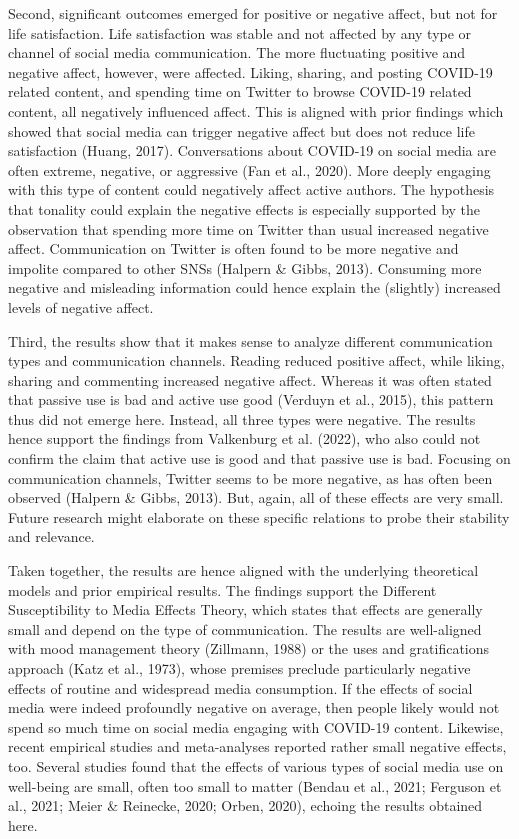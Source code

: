 \documentclass[
  man,floatsintext]{apa7}
\begin{document}
Second, significant outcomes emerged for positive or negative affect, but not for life satisfaction.
Life satisfaction was stable and not affected by any type or channel of social media communication.
The more fluctuating positive and negative affect, however, were affected.
Liking, sharing, and posting COVID-19 related content, and spending time on Twitter to browse COVID-19 related content, all negatively influenced affect.
This is aligned with prior findings which showed that social media can trigger negative affect but does not reduce life satisfaction (Huang, 2017).
Conversations about COVID-19 on social media are often extreme, negative, or aggressive (Fan et al., 2020).
More deeply engaging with this type of content could negatively affect active authors.
The hypothesis that tonality could explain the negative effects is especially supported by the observation that spending more time on Twitter than usual increased negative affect.
Communication on Twitter is often found to be more negative and impolite compared to other SNSs (Halpern \& Gibbs, 2013).
Consuming more negative and misleading information could hence explain the (slightly) increased levels of negative affect.

Third, the results show that it makes sense to analyze different communication types and communication channels.
Reading reduced positive affect, while liking, sharing and commenting increased negative affect.
Whereas it was often stated that passive use is bad and active use good (Verduyn et al., 2015), this pattern thus did not emerge here.
Instead, all three types were negative.
The results hence support the findings from Valkenburg et al. (2022), who also could not confirm the claim that active use is good and that passive use is bad.
Focusing on communication channels, Twitter seems to be more negative, as has often been observed (Halpern \& Gibbs, 2013).
But, again, all of these effects are very small.
Future research might elaborate on these specific relations to probe their stability and relevance.

Taken together, the results are hence aligned with the underlying theoretical models and prior empirical results.
The findings support the Different Susceptibility to Media Effects Theory, which states that effects are generally small and depend on the type of communication.
The results are well-aligned with mood management theory (Zillmann, 1988) or the uses and gratifications approach (Katz et al., 1973), whose premises preclude particularly negative effects of routine and widespread media consumption.
If the effects of social media were indeed profoundly negative on average, then people likely would not spend so much time on social media engaging with COVID-19 content.
Likewise, recent empirical studies and meta-analyses reported rather small negative effects, too.
Several studies found that the effects of various types of social media use on well-being are small, often too small to matter (Bendau et al., 2021; Ferguson et al., 2021; Meier \& Reinecke, 2020; Orben, 2020), echoing the results obtained here.
\end{document}
